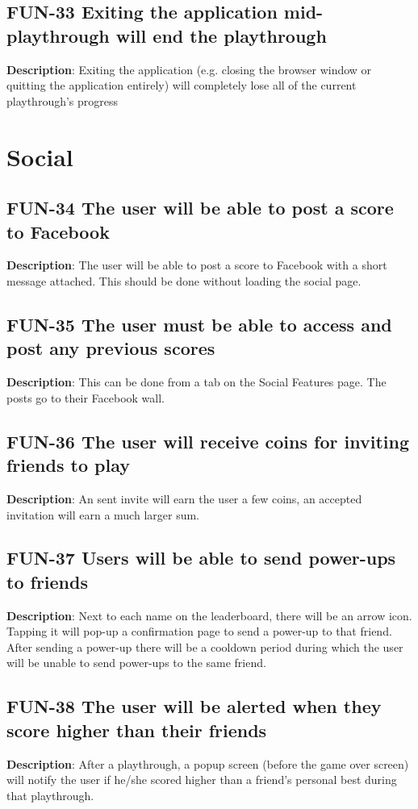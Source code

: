 \subsection{FUN-33 Exiting the application mid-playthrough will end the playthrough}
\textbf{Description}: Exiting the application (e.g. closing the browser
window or quitting the application entirely) will completely lose
all of the current playthrough\textquoteright{}s progress

\section{Social}

\subsection{FUN-34 The user will be able to post a score to Facebook}
\textbf{Description}: The user will be able to post a score to Facebook
with a short message attached. This should be done without loading
the social page.

\subsection{FUN-35 The user must be able to access and post any previous scores}
\textbf{Description}: This can be done from a tab on the Social Features
page. The posts go to their Facebook wall.

\subsection{FUN-36 The user will receive coins for inviting friends to play}
\textbf{Description}: An sent invite will earn the user a few coins,
an accepted invitation will earn a much larger sum. 

\subsection{FUN-37 Users will be able to send power-ups to friends}
\textbf{Description}: Next to each name on the leaderboard, there
will be an arrow icon. Tapping it will pop-up a confirmation page
to send a power-up to that friend. After sending a power-up there
will be a cooldown period during which the user will be unable to
send power-ups to the same friend.

\subsection{FUN-38 The user will be alerted when they score higher than their
friends}
\textbf{Description}: After a playthrough, a popup screen (before
the game over screen) will notify the user if he/she scored higher
than a friend\textquoteright{}s personal best during that playthrough.

